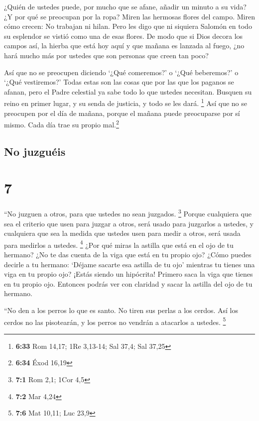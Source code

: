  ¿Quién de ustedes puede, por mucho que se afane, añadir
un minuto a su vida?  ¿Y por qué se preocupan por la
ropa? Miren las hermosas flores del campo. Miren cómo crecen: No
trabajan ni hilan.  Pero les digo que ni siquiera Salomón
en todo su esplendor se vistió como una de esas flores. 
De modo que si Dios decora los campos así, la hierba que está hoy aquí y
que mañana es lanzada al fuego, ¿no hará mucho más por ustedes que son
personas que creen tan poco?

 Así que no se preocupen diciendo `¿Qué comeremos?' o
`¿Qué beberemos?' o `¿Qué vestiremos?'  Todas estas son
las cosas que por las que los paganos se afanan, pero el Padre celestial
ya sabe todo lo que ustedes necesitan.  Busquen su reino
en primer lugar, y su senda de justicia, y todo se les dará. \footnote{\textbf{6:33}
  Rom 14,17; 1Re 3,13-14; Sal 37,4; Sal 37,25}  Así que
no se preocupen por el día de mañana, porque el mañana puede preocuparse
por sí mismo. Cada día trae su propio mal.\footnote{\textbf{6:34} Éxod
  16,19}

\hypertarget{no-juzguuxe9is}{%
\subsection{No juzguéis}\label{no-juzguuxe9is}}

\hypertarget{section-6}{%
\section{7}\label{section-6}}

 ``No juzguen a otros, para que ustedes no sean juzgados.
\footnote{\textbf{7:1} Rom 2,1; 1Cor 4,5}  Porque
cualquiera que sea el criterio que usen para juzgar a otros, será usado
para juzgarlos a ustedes, y cualquiera que sea la medida que ustedes
usen para medir a otros, será usada para medirlos a ustedes. \footnote{\textbf{7:2}
  Mar 4,24}  ¿Por qué miras la astilla que está en el ojo
de tu hermano? ¿No te das cuenta de la viga que está en tu propio ojo?
 ¿Cómo puedes decirle a tu hermano: `Déjame sacarte esa
astilla de tu ojo' mientras tu tienes una viga en tu propio ojo?
 ¡Estás siendo un hipócrita! Primero saca la viga que
tienes en tu propio ojo. Entonces podrás ver con claridad y sacar la
astilla del ojo de tu hermano.

 ``No den a los perros lo que es santo. No tiren sus
perlas a los cerdos. Así los cerdos no las pisotearán, y los perros no
vendrán a atacarlos a ustedes. \footnote{\textbf{7:6} Mat 10,11; Luc
  23,9}

